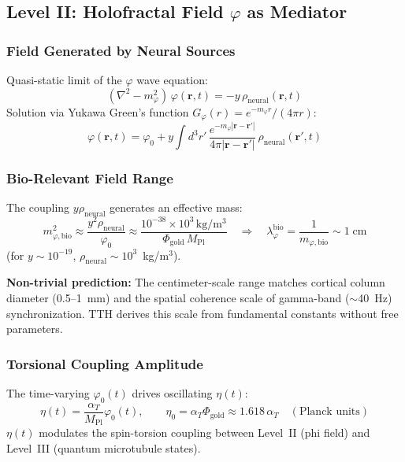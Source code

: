 \documentclass[12pt,a4paper]{article}
\newcommand{\MPl}{M_{\mathrm{Pl}}}
\newcommand{\etacoupl}{\eta(t)}
\newcommand{\alphaT}{\alpha_T}
\newcommand{\phigold}{\Phi_{\mathrm{gold}}}
\numberwithin{equation}{section}
\begin{document}
\subsection{Level II: Holofractal Field $\varphi$ as Mediator}

\subsubsection{Field Generated by Neural Sources}

Quasi-static limit of the $\varphi$ wave equation:
\begin{equation}
  (\nabla^2 - m_\varphi^2)\,\varphi(\mathbf{r},t) = -y\,\rho_{\mathrm{neural}}(\mathbf{r},t)
  \label{eq:phi_quasi}
\end{equation}
Solution via Yukawa Green's function $G_\varphi(r) = e^{-m_\varphi r}/(4\pi r)$:
\begin{equation}
  \varphi(\mathbf{r},t) = \varphi_0 + y\int d^3r'\,
  \frac{e^{-m_\varphi|\mathbf{r}-\mathbf{r}'|}}{4\pi|\mathbf{r}-\mathbf{r}'|}\,
  \rho_{\mathrm{neural}}(\mathbf{r}',t)
  \label{eq:phi_solution}
\end{equation}

\subsubsection{Bio-Relevant Field Range}

The coupling $y\rho_{\mathrm{neural}}$ generates an effective mass:
\begin{equation}
  m_{\varphi,\mathrm{bio}}^2 \approx \frac{y^2\rho_{\mathrm{neural}}}{\varphi_0}
  \approx \frac{10^{-38}\times10^3\,\mathrm{kg/m^3}}{\phigold\,\MPl}
  \quad\Rightarrow\quad
  \lambda_\varphi^{\mathrm{bio}} = \frac{1}{m_{\varphi,\mathrm{bio}}} \sim 1\;\mathrm{cm}
  \label{eq:range}
\end{equation}
(for $y \sim 10^{-19}$, $\rho_{\mathrm{neural}} \sim 10^3$~kg/m$^3$).

\textbf{Non-trivial prediction:} The centimeter-scale range matches cortical
column diameter (0.5--1~mm) and the spatial coherence scale of
gamma-band ($\sim$40~Hz) synchronization. TTH derives this scale
from fundamental constants without free parameters.

\subsubsection{Torsional Coupling Amplitude}

The time-varying $\varphi_0(t)$ drives oscillating $\etacoupl$:
\begin{equation}
  \etacoupl = \frac{\alphaT}{\MPl}\varphi_0(t),
  \qquad
  \eta_0 = \alphaT\phigold \approx 1.618\,\alphaT \quad (\text{Planck units})
  \label{eq:eta}
\end{equation}
$\etacoupl$ modulates the spin-torsion coupling between Level~II
(phi field) and Level~III (quantum microtubule states).
\end{document}
